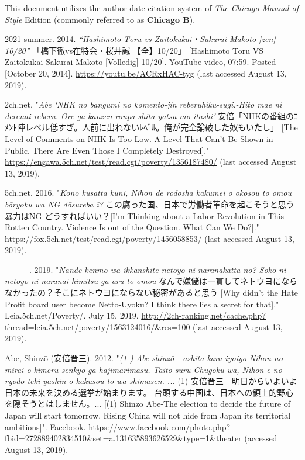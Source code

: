 \documentclass[10pt,british,A4paper,twoside]{memoir}
\begin{document}
\setlength{\parindent}{-0.2in} \setlength{\leftskip}{0.2in}
\setlength{\parskip}{0em} \noindent

This document utilizes the author-date citation system of \emph{The
Chicago Manual of Style}  Edition (commonly referred to as
\textbf{Chicago B}).

\vspace{4mm} \setlength{\parskip}{0em} \footnotesize

\hypertarget{refs}{}
\hypertarget{ref-2021_summer_vs_2014}{}
2021 summer. 2014. \emph{“Hashimoto Tōru vs Zaitokukai・Sakurai Makoto [zen] 10/20”} 「橋下徹vs在特会・桜井誠 【全】10/20」 [Hashimoto Tōru VS Zaitokukai  Sakurai Makoto [Volledig] 10/20]. YouTube video, 07:59. Posted [October 20, 2014]. \url{https://youtu.be/ACRxHAC-tyg} (last accessed August 13, 2019).

\hypertarget{ref-2ch.net_eng._2012}{}
2ch.net. "\emph{Abe `NHK no bangumi no komento-jin reberuhiku-sugi.-Hito mae ni derenai reberu. Ore ga kanzen ronpa shita yatsu mo itashi'} 安倍「NHKの番組のｺﾒﾝﾄ陣レベル低すぎ。人前に出れないﾚﾍﾞﾙ。俺が完全論破した奴もいたし」 [The Level of Comments on NHK Is Too Low. A Level That Can't Be Shown in Public. There Are Even Those I Completely Destroyed]."
\url{https://engawa.5ch.net/test/read.cgi/poverty/1356187480/} (last accessed August 13, 2019).

\hypertarget{ref-5ch.net_eng._2016}{}
5ch.net. 2016. "\emph{Kono kusatta kuni, Nihon de rōdōsha kakumei o okosou to omou bōryoku wa NG dōsureba ī?} この腐った国、日本で労働者革命を起こそうと思う 暴力はNG どうすればいい？[I’m Thinking about a Labor Revolution in This Rotten Country. Violence Is out of the Question. What Can We Do?]."
\url{https://fox.5ch.net/test/read.cgi/poverty/1456058853/} (last accessed August 13, 2019).

\hypertarget{ref-5ch.net_eng._2019}{}
---------. 2019. "\emph{Nande kenmō wa ikkanshite netōyo ni naranakatta no? Soko ni netōyo ni naranai himitsu ga aru to omou} なんで嫌儲は一貫してネトウヨにならなかったの？そこにネトウヨにならない秘密があると思う [Why didn't the Hate Profit board user become Netto-Uyoku? I think there lies a secret for that]." Leia.5ch.net/Poverty/. July 15, 2019.
\url{http://2ch-ranking.net/cache.php?thread=leia.5ch.net/poverty/1563124016/\&res=100} (last accessed August 13, 2019).

\hypertarget{ref-abe_1_2012}{}
Abe, Shinzō (安倍晋三). 2012. "\emph{(1 ) Abe shinzō - ashita kara iyoiyo Nihon no mirai o kimeru senkyo ga hajimarimasu. Taitō suru Chūgoku wa, Nihon e no ryōdo-teki yashin o kakusou to wa shimasen. ...} (1) 安倍晋三 - 明日からいよいよ日本の未来を決める選挙が始まります。 台頭する中国は、日本への領土的野心を隠そうとはしません。... [(1) Shinzo Abe-The election to decide the future of Japan will start tomorrow. Rising China will not hide from Japan its territorial ambitions]". Facebook.
\url{https://www.facebook.com/photo.php?fbid=272889402834510\&set=a.131635893626529\&type=1\&theater} (accessed August 13, 2019).
\end{document}
